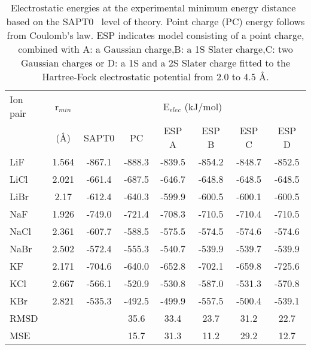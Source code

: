 \begin{table}[ht]
\centering
\caption{Electrostatic energies at the experimental minimum energy distance~\cite{NISTa} based on the SAPT0~\cite{Sherill2013a} level of theory. Point charge (PC) energy follows from Coulomb's law. ESP indicates model  consisting of a point charge, combined with A:  a Gaussian charge,B:  a 1S Slater charge,C:  two Gaussian charges or D:  a 1S and a 2S Slater charge fitted to the Hartree-Fock electrostatic potential from 2.0 to 4.5 {\AA}.}
\label{tab:sapt10}
\begin{tabular}{lccccccc}
\hline
Ion pair & r$_{min}$ & \multicolumn{6}{c}{E$_{elec}$ (kJ/mol)}\\
& ({\AA})&                 SAPT0 & PC  & ESP A  & ESP B  & ESP C  & ESP D \\
\hline
LiF & 1.564 & -867.1 & -888.3  & -839.5 & -854.2 & -848.7 & -852.5\\
LiCl & 2.021 & -661.4 & -687.5  & -646.7 & -648.8 & -648.5 & -648.5\\
LiBr & 2.17 & -612.4 & -640.3  & -599.9 & -600.5 & -600.1 & -600.5\\
NaF & 1.926 & -749.0 & -721.4  & -708.3 & -710.5 & -710.4 & -710.5\\
NaCl & 2.361 & -607.7 & -588.5  & -575.5 & -574.5 & -574.6 & -574.6\\
NaBr & 2.502 & -572.4 & -555.3  & -540.7 & -539.9 & -539.7 & -539.9\\
KF & 2.171 & -704.6 & -640.0  & -652.8 & -702.1 & -659.8 & -725.6\\
KCl & 2.667 & -566.1 & -520.9  & -530.8 & -587.0 & -531.3 & -570.8\\
KBr & 2.821 & -535.3 & -492.5  & -499.9 & -557.5 & -500.4 & -539.1\\
\hline
RMSD & & & 35.6 & 33.4 & 23.7 & 31.2 & 22.7\\
MSE & & & 15.7 & 31.3 & 11.2 & 29.2 & 12.7\\
\hline
\end{tabular}
\end{table}
